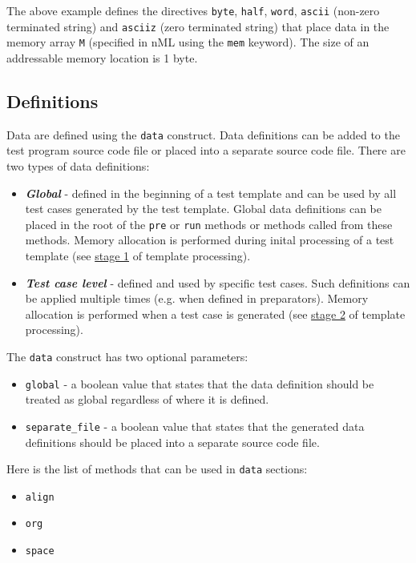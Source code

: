 \documentclass[oneside,final,12pt]{extreport}
\begin{document}
The above example defines the directives \texttt{byte}, \texttt{half}, \texttt{word},
\texttt{ascii} (non-zero terminated string) and \texttt{asciiz} (zero terminated string)
that place data in the memory array \texttt{M} (specified in nML using the \texttt{mem} keyword).
The size of an addressable memory location is 1 byte.

\subsection{Definitions}

Data are defined using the \texttt{data} construct. Data definitions can be added to the test
program source code file or placed into a separate source code file. There are two types of
data definitions:

\begin{itemize}
\item \textbf{\textit{Global}} - defined in the beginning of a test template and can be used by
      all test cases generated by the test template. Global data definitions can be placed in
      the root of the \texttt{pre} or \texttt{run} methods or methods called from these methods.
      Memory allocation is performed during inital processing of a test template (see
      \hyperref[ttp_stage_1]{stage 1} of template processing).

\item \textbf{\textit{Test case level}} - defined and used by specific test cases. Such definitions
      can be applied multiple times (e.g. when defined in preparators).
      Memory allocation is performed when a test case is generated (see
      \hyperref[ttp_stage_2]{stage 2} of template processing).
\end{itemize}

The \texttt{data} construct has two optional parameters:

\begin{itemize}
\item \texttt{global} - a boolean value that states that the data definition should be
      treated as global regardless of where it is defined.
\item \texttt{separate{\_}file} - a boolean value that states that the generated data
      definitions should be placed into a separate source code file.
\end{itemize}

Here is the list of methods that can be used in \texttt{data} sections:

\begin{itemize}
\item \texttt{align}
\item \texttt{org}
\item \texttt{space}
\end{itemize}
\end{document}
